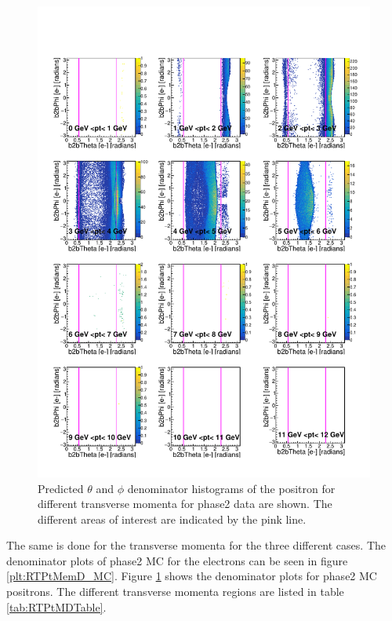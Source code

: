 \documentclass[a4paper,11pt,twosided,final,german,openbib,pdftex,listof=totoc,bibliography=totoc]{scrbook}
\begin{document}
\begin{figure}[h!]
	\includegraphics[width=\textwidth]{Plots/master/RTPtMepD_MC.pdf}
	\caption[Denominator $\theta$-$\phi$ Positron Transverse Momentum MC]{Predicted $\theta$ and $\phi$ denominator histograms of the positron for different transverse momenta for phase2 data are shown. The different areas of interest are indicated by the pink line.
}
	\label{plt:RTPtMepD_MC}
\end{figure}


The same is done for the transverse momenta for the three different cases. The denominator plots of phase2 MC for the electrons can be seen in figure \ref{plt:RTPtMemD_MC}. Figure \ref{plt:RTPtMepD_MC} shows the denominator plots for phase2 MC positrons. The different transverse momenta regions are listed in table \ref{tab:RTPtMDTable}.
\end{document}
